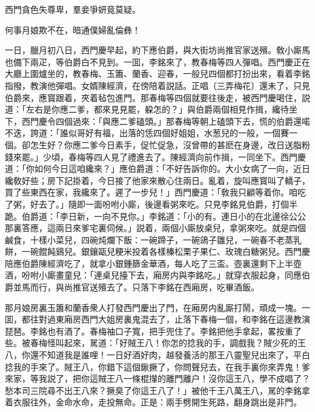 \begin{myquote}
西門貪色失尊卑，羣妾爭妍竟莫疑。

何事月娘欺不在，暗通僕婦亂倫彝！
\end{myquote}

一日，臘月初八日，西門慶早起，約下應伯爵，與大街坊尚推官家送殯。敎小廝馬也備下兩疋，等伯爵白不見到。一囬，李銘來了，教春梅等四人彈唱。西門慶正在大廳上圍爐坐的，教春梅、玉簫、蘭香、迎春，一般兒四個都打扮出來，看着李銘指撥，教演他彈唱。女婿陳經濟，在傍陪着説話。正唱〔三弄梅花〕還未了，只見伯爵來，應寳跟着，夾着毡包進門。那春梅等四個就要往後走，被西門慶喝住，説道：「左右是你應二爹，都來見見罷，躱怎的？」與伯爵兩個相見作揖，纔待坐下，西門慶令四個過來：「與應二爹磕頭。」那春梅等朝上磕頭下去，慌的伯爵還喏不迭，誇道：「誰似哥好有福，出落的恁四個好姐姐，水葱兒的一般，一個賽一個。卻怎生好？你應二爹今日素手，促忙促急，沒曾帶的甚麽在身邊，改日送脂粉錢來罷。」少頃，春梅等四人見了禮進去了。陳經濟向前作揖，一同坐下。西門慶道：「你如何今日這咱纔來？」應伯爵道：「不好告訴你的。大小女病了一向，近日纔敎好些；房下記掛着，今日接了他家來散心住兩日。亂着，旋叫應寳叫了轎子，買了些東西在家，我纔來了。遲了一步兒！」西門慶道：「敎我只顧等着你。咱吃了粥，好去了。」隨即一面吩咐小廝，後邊看粥來吃。只見李銘見伯爵，打個半跪。伯爵道：「李日新，一向不見你。」李銘道：「小的有。連日小的在北邊徐公公那裏答應，這兩日來爹宅裏伺候。」説着，兩個小廝放桌兒，拿粥來吃。就是四個鹹食，十樣小菜兒，四碗炖爛下飯：一碗蹄子，一碗鴿子雛兒，一碗春不老蒸乳餅，一碗餛飩鷄兒。銀鑲甌兒粳米投着各樣榛松栗子果仁、玫瑰白糖粥兒。西門慶陪應伯爵陳經濟吃了，就拿小銀鍾篩金華酒，每人吃了三盃。壺裏還剩下上半壺酒，吩咐小廝畫童兒：「連桌兒擡下去，廂房内與李銘吃。」就穿衣服起身，同應伯爵並馬而行，與尚推官送殯去了。只落下李銘在西廂房，吃畢酒飯。

那月娘房裏玉簫和蘭香衆人打發西門慶出了門，在廂房内亂廝打鬧，頑成一塊。一囬，都往對過東廂房西門大姐房裏鬼混去了，止落下春梅一個，和李銘在這邊教演琵琶。李銘也有酒了。春梅袖口子寬，把手兜住了。李銘把他手拿起，畧按重了些。被春梅怪叫起來，駡道：「好賊王八！你怎的捻我的手，調戲我？賊少死的王八，你還不知道我是誰哩！一日好酒好肉，越發養活的那王八靈聖兒出來了，平白捻我的手來了。賊王八，你錯下這個鍬撅了，你問聲兒去，在我手裏你來弄鬼！爹來家，等我説了，把你這賊王八一條棍攆的離門離户！沒你這王八，學不成唱了？愁本司三院尋不出王八來？撅臭了你這王八了！」被他千王八萬王八，駡的李銘拿着衣服往外，金命水命，走投無命。正是：兩手劈開生死路，翻身跳出是非門。

